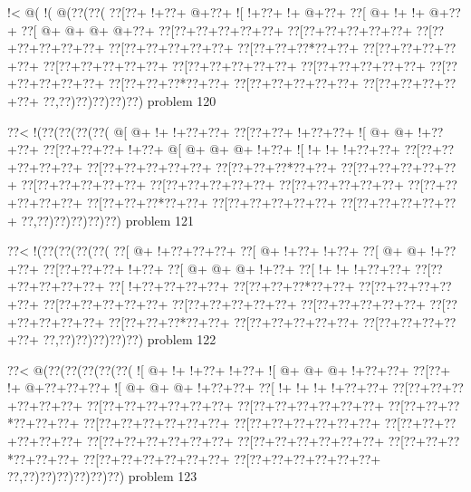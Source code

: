 \vbox{\vbox{\goo
\- !<\- @(\- !(\- @(\0??(\0??(
\0??[\0??+\- !+\0??+\- @+\0??+
\- ![\- !+\0??+\- !+\- @+\0??+
\0??[\- @+\- !+\- !+\- @+\0??+
\0??[\- @+\- @+\- @+\- @+\0??+
\0??[\0??+\0??+\0??+\0??+\0??+
\0??[\0??+\0??+\0??+\0??+\0??+
\0??[\0??+\0??+\0??+\0??+\0??+
\0??[\0??+\0??+\0??+\0??+\0??+
\0??[\0??+\0??+\0??*\0??+\0??+
\0??[\0??+\0??+\0??+\0??+\0??+
\0??[\0??+\0??+\0??+\0??+\0??+
\0??[\0??+\0??+\0??+\0??+\0??+
\0??[\0??+\0??+\0??+\0??+\0??+
\0??[\0??+\0??+\0??+\0??+\0??+
\0??[\0??+\0??+\0??*\0??+\0??+
\0??[\0??+\0??+\0??+\0??+\0??+
\0??[\0??+\0??+\0??+\0??+\0??+
\0??,\0??)\0??)\0??)\0??)\0??)
}
\hfil problem 120\hfil\break
}

\vbox{\vbox{\goo
\0??<\- !(\0??(\0??(\0??(\0??(
\- @[\- @+\- !+\- !+\0??+\0??+
\0??[\0??+\0??+\- !+\0??+\0??+
\- ![\- @+\- @+\- !+\0??+\0??+
\0??[\0??+\0??+\0??+\- !+\0??+
\- @[\- @+\- @+\- @+\- !+\0??+
\- ![\- !+\- !+\- !+\0??+\0??+
\0??[\0??+\0??+\0??+\0??+\0??+
\0??[\0??+\0??+\0??+\0??+\0??+
\0??[\0??+\0??+\0??*\0??+\0??+
\0??[\0??+\0??+\0??+\0??+\0??+
\0??[\0??+\0??+\0??+\0??+\0??+
\0??[\0??+\0??+\0??+\0??+\0??+
\0??[\0??+\0??+\0??+\0??+\0??+
\0??[\0??+\0??+\0??+\0??+\0??+
\0??[\0??+\0??+\0??*\0??+\0??+
\0??[\0??+\0??+\0??+\0??+\0??+
\0??[\0??+\0??+\0??+\0??+\0??+
\0??,\0??)\0??)\0??)\0??)\0??)
}
\hfil problem 121\hfil\break
}

\vbox{\vbox{\goo
\0??<\- !(\0??(\0??(\0??(\0??(
\0??[\- @+\- !+\0??+\0??+\0??+
\0??[\- @+\- !+\0??+\- !+\0??+
\0??[\- @+\- @+\- !+\0??+\0??+
\0??[\0??+\0??+\0??+\- !+\0??+
\0??[\- @+\- @+\- @+\- !+\0??+
\0??[\- !+\- !+\- !+\0??+\0??+
\0??[\0??+\0??+\0??+\0??+\0??+
\0??[\- !+\0??+\0??+\0??+\0??+
\0??[\0??+\0??+\0??*\0??+\0??+
\0??[\0??+\0??+\0??+\0??+\0??+
\0??[\0??+\0??+\0??+\0??+\0??+
\0??[\0??+\0??+\0??+\0??+\0??+
\0??[\0??+\0??+\0??+\0??+\0??+
\0??[\0??+\0??+\0??+\0??+\0??+
\0??[\0??+\0??+\0??*\0??+\0??+
\0??[\0??+\0??+\0??+\0??+\0??+
\0??[\0??+\0??+\0??+\0??+\0??+
\0??,\0??)\0??)\0??)\0??)\0??)
}
\hfil problem 122\hfil\break
}

\vbox{\vbox{\goo
\0??<\- @(\0??(\0??(\0??(\0??(\0??(
\- ![\- @+\- !+\- !+\0??+\- !+\0??+
\- ![\- @+\- @+\- @+\- !+\0??+\0??+
\0??[\0??+\- !+\- @+\0??+\0??+\0??+
\- ![\- @+\- @+\- @+\- !+\0??+\0??+
\0??[\- !+\- !+\- !+\- !+\0??+\0??+
\0??[\0??+\0??+\0??+\0??+\0??+\0??+
\0??[\0??+\0??+\0??+\0??+\0??+\0??+
\0??[\0??+\0??+\0??+\0??+\0??+\0??+
\0??[\0??+\0??+\0??*\0??+\0??+\0??+
\0??[\0??+\0??+\0??+\0??+\0??+\0??+
\0??[\0??+\0??+\0??+\0??+\0??+\0??+
\0??[\0??+\0??+\0??+\0??+\0??+\0??+
\0??[\0??+\0??+\0??+\0??+\0??+\0??+
\0??[\0??+\0??+\0??+\0??+\0??+\0??+
\0??[\0??+\0??+\0??*\0??+\0??+\0??+
\0??[\0??+\0??+\0??+\0??+\0??+\0??+
\0??[\0??+\0??+\0??+\0??+\0??+\0??+
\0??,\0??)\0??)\0??)\0??)\0??)\0??)
}
\hfil problem 123\hfil\break
}

